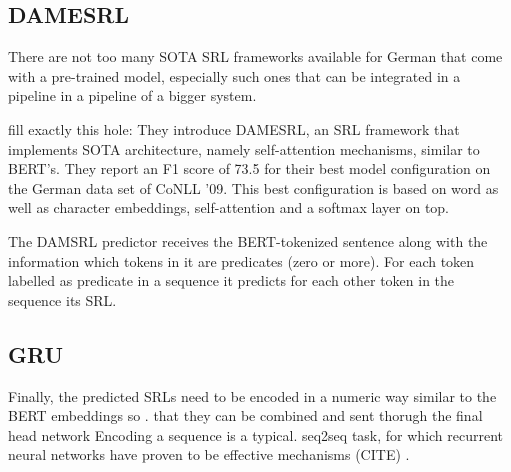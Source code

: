 

\subsection{DAMESRL}

There are not too many SOTA SRL frameworks available for German that come with a pre-trained model,
especially such ones that can be integrated in a pipeline in a pipeline of a bigger system.

\cite{do2018flexible} fill exactly this hole: They introduce DAMESRL, an SRL framework that
implements SOTA architecture, namely self-attention mechanisms, similar to BERT's. They report
an F1 score of 73.5 for their best model configuration on the German data set of CoNLL '09.
This best configuration is based on word as well as character embeddings, self-attention and a
softmax layer on top.

The DAMSRL predictor receives the BERT-tokenized sentence along with the information which tokens
in it are predicates (zero or more). For each token labelled as predicate in a sequence it predicts
for each other token in the sequence its SRL.

\subsection{GRU}

Finally, the predicted SRLs need to be encoded in a numeric way similar to the BERT embeddings so .
that they can be combined and sent thorugh the final head network Encoding a sequence is a typical.
seq2seq task, for which recurrent neural networks have proven to be effective mechanisms (CITE)   .

